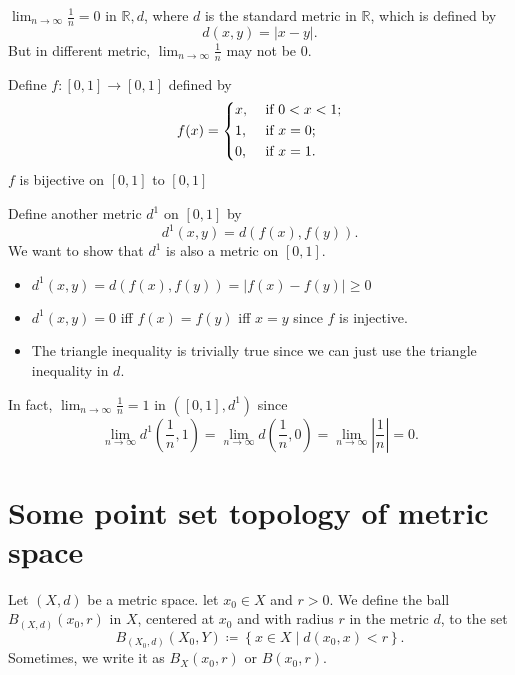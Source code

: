 \begin{eg}
    \(\lim_{n \to \infty} \frac{1}{n} = 0 \) in \(\mathbb{R} , d\), where \(d\) is the standard metric in \(\mathbb{R} \), which is defined by 
    \[
        d(x, y) = \vert x - y \vert. 
    \]    
    But in different metric, \(\lim_{n \to \infty} \frac{1}{n} \) may not be \(0\).  
\end{eg}
\begin{explanation}
    Define \(f: [0, 1] \to [0, 1]\) defined by
\[
    f(x) = \begin{dcases}
        x, &\text{ if } 0<x<1  ;\\
        1, &\text{ if } x=0;\\
        0, &\text{ if } x=1.
    \end{dcases}
\]
\(f\) is bijective on \([0, 1]\) to \([0, 1]\)  

Define another metric \(d^1\) on \([0, 1]\) by 
\[
    d^1(x, y) = d(f(x), f(y)).
\]  
We want to show that \(d^1\) is also a metric on \([0, 1]\). 
\begin{itemize}
    \item \(d^1(x,y)=d(f(x), f(y)) = \vert f(x) - f(y) \vert \ge 0\)
    \item \(d^1(x, y) = 0\) iff \(f(x) = f(y)\) iff \(x=y\) since \(f\) is injective.  
    \item The triangle inequality is trivially true since we can just use the triangle inequality in \(d\).   
\end{itemize}  

In fact, \(\lim_{n \to \infty} \frac{1}{n} = 1 \) in \(\left( [0, 1], d^1 \right) \) since 
\[
    \lim_{n \to \infty} d^{1}\left( \frac{1}{n}, 1 \right) = \lim_{n \to \infty} d \left( \frac{1}{n}, 0 \right) = \lim_{n \to \infty} \left\vert \frac{1}{n} \right\vert = 0.      
\]  
\end{explanation}

\section{Some point set topology of metric space}
\begin{definition}[ball] \label{def: ball}
    Let \((X,d)\) be a metric space. let \(x_0 \in X\) and \(r > 0\). We define the ball \(B_{(X, d)} (x_0, r)\) in \(X\), centered at \(x_0\) and with radius \(r\) in the metric \(d\), to the set 
    \[
        B_{(X_0, d)} (X_0, Y) \coloneqq \left\{ x \in X \mid d(x_0, x) < r \right\}.
    \]
    Sometimes, we write it as \(B_X(x_0, r)\) or \(B(x_0, r)\).   
\end{definition}

